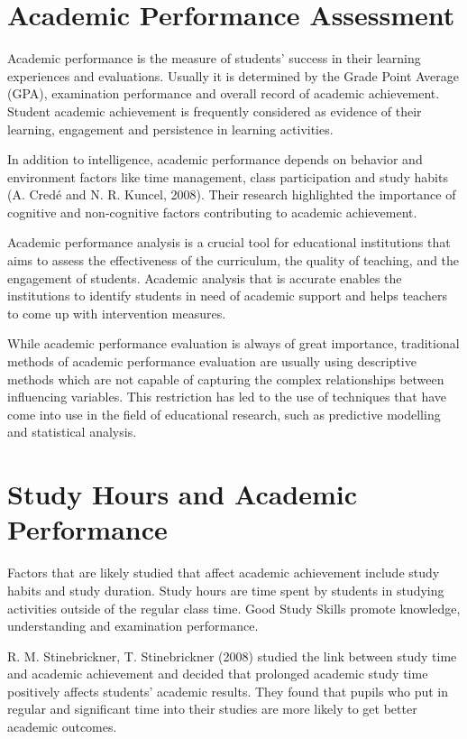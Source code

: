 \documentclass[12pt]{report}
\begin{document}
	\section{Academic Performance Assessment}
	Academic performance is the measure of students' success in their learning experiences and evaluations. Usually it is determined by the Grade Point Average (GPA), examination performance and overall record of academic achievement. Student academic achievement is frequently considered as evidence of their learning, engagement and persistence in learning activities.
	
	In addition to intelligence, academic performance depends on behavior and environment factors like time management, class participation and study habits (A. Credé and N. R. Kuncel, 2008). Their research highlighted the importance of cognitive and non-cognitive factors contributing to academic achievement.
	
	Academic performance analysis is a crucial tool for educational institutions that aims to assess the effectiveness of the curriculum, the quality of teaching, and the engagement of students. Academic analysis that is accurate enables the institutions to identify students in need of academic support and helps teachers to come up with intervention measures.
	
	While academic performance evaluation is always of great importance, traditional methods of academic performance evaluation are usually using descriptive methods which are not capable of capturing the complex relationships between influencing variables. This restriction has led to the use of techniques that have come into use in the field of educational research, such as predictive modelling and statistical analysis.
	\section{Study Hours and Academic Performance}	
	Factors that are likely studied that affect academic achievement include study habits and study duration. Study hours are time spent by students in studying activities outside of the regular class time. Good Study Skills promote knowledge, understanding and examination performance.
	
	R. M. Stinebrickner, T. Stinebrickner (2008) studied the link between study time and academic achievement and decided that prolonged academic study time positively affects students' academic results. They found that pupils who put in regular and significant time into their studies are more likely to get better academic outcomes.
	
\end{document}
